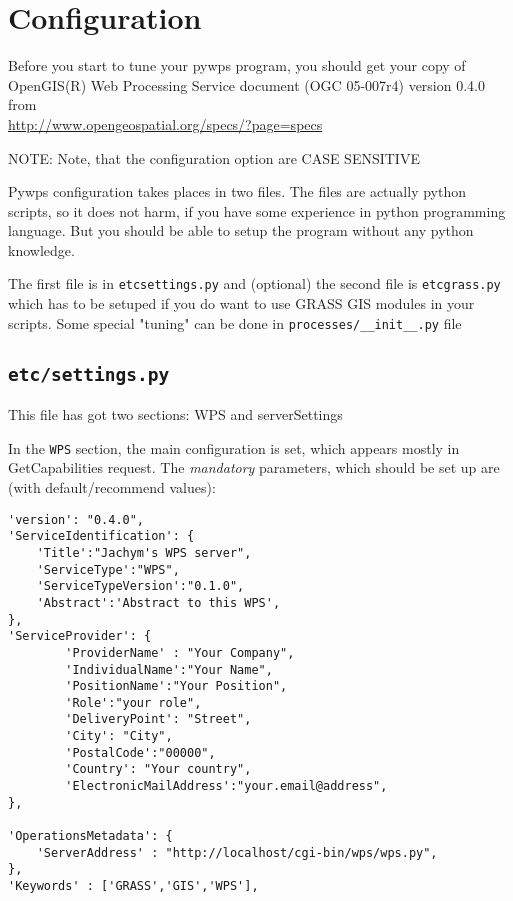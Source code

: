 \documentclass[a4paper,11pt]{article}
\newcommand{\note}[1]{\medskip{}\noindent{}NOTE: #1\medskip{}}
\begin{document}
    
\section{Configuration}
    
Before you start to tune your pywps program, you should get your copy of
OpenGIS(R) Web Processing Service document (OGC 05-007r4) version 0.4.0
from\\ \url{http://www.opengeospatial.org/specs/?page=specs}
    
\note{Note, that the configuration option are CASE SENSITIVE}
    
Pywps configuration takes places in two files. The files are actually python
scripts, so it does not harm, if you have some experience in python
programming language. But you should be able to setup the program without
any python knowledge.

The first file is in \texttt{etc\/settings.py} and (optional) the second file is
\texttt{etc\/grass.py} which has to be setuped if you do want to use
GRASS GIS modules in your scripts. Some special "tuning" can be done in \texttt{processes/\_\_init\_\_.py}
file
    
\subsection{\texttt{etc/settings.py}}
    
This file has got two sections: WPS and serverSettings
    
In the \texttt{WPS} section, the main configuration is set, which appears mostly in
GetCapabilities request. The \emph{mandatory} parameters, which should be set up
are (with default/recommend values):
    

\begin{verbatim}
'version': "0.4.0",
'ServiceIdentification': {
    'Title':"Jachym's WPS server",
    'ServiceType':"WPS",
    'ServiceTypeVersion':"0.1.0",
    'Abstract':'Abstract to this WPS',
},
'ServiceProvider': {
        'ProviderName' : "Your Company",
        'IndividualName':"Your Name",
        'PositionName':"Your Position",
        'Role':"your role",
        'DeliveryPoint': "Street",
        'City': "City",
        'PostalCode':"00000",
        'Country': "Your country",
        'ElectronicMailAddress':"your.email@address",
},

'OperationsMetadata': {
    'ServerAddress' : "http://localhost/cgi-bin/wps/wps.py",
},
'Keywords' : ['GRASS','GIS','WPS'],
\end{verbatim}
\end{document}
